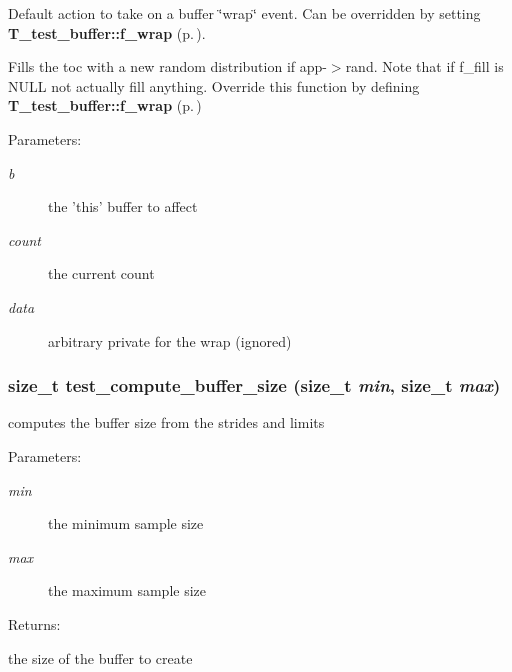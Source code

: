 Default action to take on a buffer \char`\"{}wrap\char`\"{} event. Can be overridden by setting {\bf T\_\-test\_\-buffer::f\_\-wrap} {\rm (p.\,\pageref{structT__test__buffer_m20})}.

Fills the toc with a new random distribution if app-$>$rand. Note that if f\_\-fill is NULL not actually fill anything. Override this function by defining {\bf T\_\-test\_\-buffer::f\_\-wrap} {\rm (p.\,\pageref{structT__test__buffer_m20})} \begin{Desc}
\item[Parameters: ]\par
\begin{description}
\item[{\em 
b}]the 'this' buffer to affect \item[{\em 
count}]the current count \item[{\em 
data}]arbitrary private for the wrap (ignored) \end{description}
\end{Desc}
\subsubsection{\setlength{\rightskip}{0pt plus 5cm}size\_\-t test\_\-compute\_\-buffer\_\-size (size\_\-t {\em min}, size\_\-t {\em max})}\label{test__utils_8h_a41}


computes the buffer size from the strides and limits

\begin{Desc}
\item[Parameters: ]\par
\begin{description}
\item[{\em 
min}]the minimum sample size \item[{\em 
max}]the maximum sample size \end{description}
\end{Desc}
\begin{Desc}
\item[Returns: ]\par
the size of the buffer to create \end{Desc}

